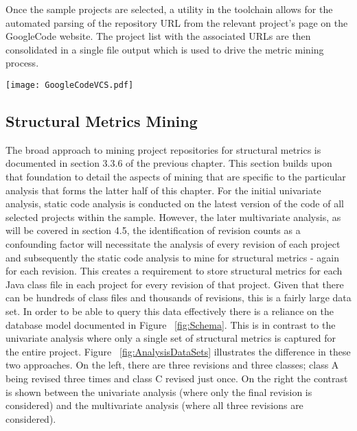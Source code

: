 Once the sample projects are selected, a utility in the toolchain allows for the automated parsing of the repository URL from the relevant project's page on the GoogleCode website. The project list with the associated URLs are then consolidated in a single file output which is used to drive the metric mining process.

\begin{table}
\centering 
{}
\begin{tabular}
 \centering 
 \texttt{[image: GoogleCodeVCS.pdf]}
 \label{tab:GoogleCodeVCS}
\end{tabular}
\end{table}


\subsection{Structural Metrics Mining}
The broad approach to mining project repositories for structural metrics is documented in section 3.3.6 of the previous chapter. This section builds upon that foundation to detail the aspects of mining that are specific to the particular analysis that forms the latter half of this chapter. For the initial univariate analysis, static code analysis is conducted on the latest version of the code of all selected projects within the sample. However, the later multivariate analysis, as will be covered in section 4.5, the identification of revision counts as a confounding factor will necessitate the analysis of every revision of each project and subsequently the static code analysis to mine for structural metrics - again for each revision. This creates a requirement to store structural metrics for each Java class file in each project for every revision of that project. Given that there can be hundreds of class files and thousands of revisions, this is a fairly large data set. In order to be able to query this data effectively there is a reliance on the database model documented in Figure ~\ref{fig:Schema}. This is in contrast to the univariate analysis where only a single set of structural metrics is captured for the entire project. Figure ~\ref{fig:AnalysisDataSets} illustrates the difference in these two approaches. On the left, there are three revisions and three classes; class A being revised three times and class C revised just once. On the right the contrast is shown between the univariate analysis (where only the final revision is considered) and the multivariate analysis (where all three revisions are considered).

